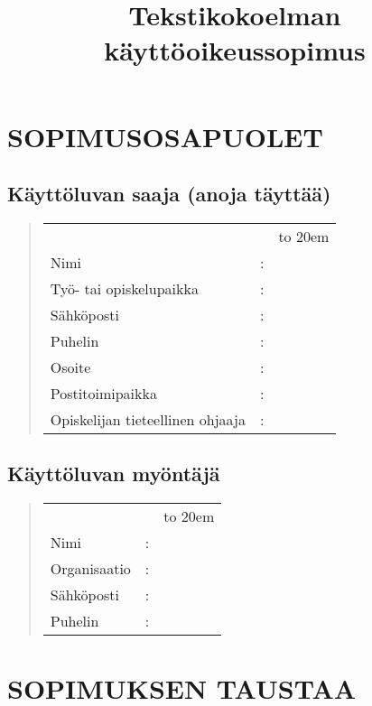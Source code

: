 \documentclass[a4paper,finnish]{article}
\begin{document}
\title{Tekstikokoelman käyttöoikeussopimus} 
\author{}
\date{}
\maketitle
\section{SOPIMUSOSAPUOLET}
\subsection{Käyttöluvan saaja (anoja täyttää)}

\begin{quote}
  \def\arraystretch{1.2}
  \begin{tabular}{lcl}
    &&\hbox to 20em{}\\
    Nimi&:&\\
    \cline{3-3}
    Työ- tai opiskelupaikka&:&\\
    \cline{3-3}
    Sähköposti&:&\\
    \cline{3-3}
    Puhelin&:&\\
    \cline{3-3}
    Osoite&:&\\
    \cline{3-3}
    Postitoimipaikka&:&\\
    \cline{3-3}
    Opiskelijan tieteellinen ohjaaja &:&\\
    \cline{3-3}
  \end{tabular}
\end{quote}

\subsection{Käyttöluvan myöntäjä}
\begin{quote}
  \def\arraystretch{1.2}
\begin{tabular}{lcl}
    &&\hbox to 20em{}\\
    Nimi&:&\\
    \cline{3-3}
    Organisaatio&:&\\
    \cline{3-3}
    Sähköposti&:&\\
    \cline{3-3}
    Puhelin&:&\\
    \cline{3-3}
\end{tabular}
\end{quote}

\section{SOPIMUKSEN TAUSTAA}
\end{document}
